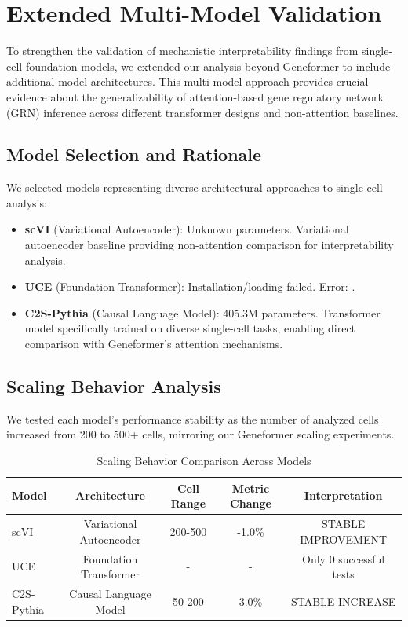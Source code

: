 
\section{Extended Multi-Model Validation}
\label{sec:extended_validation}

To strengthen the validation of mechanistic interpretability findings from single-cell foundation models, we extended our analysis beyond Geneformer to include additional model architectures. This multi-model approach provides crucial evidence about the generalizability of attention-based gene regulatory network (GRN) inference across different transformer designs and non-attention baselines.

\subsection{Model Selection and Rationale}
\label{subsec:model_selection}

We selected models representing diverse architectural approaches to single-cell analysis:

\begin{itemize}

\item \textbf{scVI} (Variational Autoencoder): Unknown parameters. Variational autoencoder baseline providing non-attention comparison for interpretability analysis.
\item \textbf{UCE} (Foundation Transformer): Installation/loading failed. Error: .
\item \textbf{C2S-Pythia} (Causal Language Model): 405.3M parameters. Transformer model specifically trained on diverse single-cell tasks, enabling direct comparison with Geneformer's attention mechanisms.
\end{itemize}

\subsection{Scaling Behavior Analysis}
\label{subsec:scaling_analysis}

We tested each model's performance stability as the number of analyzed cells increased from 200 to 500+ cells, mirroring our Geneformer scaling experiments.

\begin{table}[ht]
\centering
\caption{Scaling Behavior Comparison Across Models}
\label{tab:scaling_comparison}
\begin{tabular}{|l|c|c|c|c|}
\hline
\textbf{Model} & \textbf{Architecture} & \textbf{Cell Range} & \textbf{Metric Change} & \textbf{Interpretation} \\
\hline
scVI & Variational Autoencoder & 200-500 & -1.0\% & STABLE IMPROVEMENT \\
UCE & Foundation Transformer & - & - & Only 0 successful tests \\
C2S-Pythia & Causal Language Model & 50-200 & 3.0\% & STABLE INCREASE \\
\hline
\end{tabular}
\end{table}


